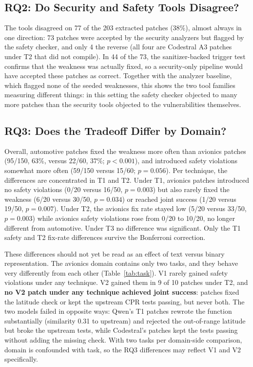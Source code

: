 \documentclass[12pt]{IEEEtran}
\begin{document}
\subsection{RQ2: Do Security and Safety Tools Disagree?}
The tools disagreed on 77 of the 203 extracted patches (38\%), almost always in one direction: 73 patches were accepted by the security analyzers but flagged by the safety checker, and only 4 the reverse (all four are Codestral A3 patches under T2 that did not compile). In 44 of the 73, the sanitizer-backed trigger test confirms that the weakness was actually fixed, so a security-only pipeline would have accepted these patches as correct. Together with the analyzer baseline, which flagged none of the seeded weaknesses, this shows the two tool families measuring different things: in this setting the safety checker objected to many more patches than the security tools objected to the vulnerabilities themselves.

\subsection{RQ3: Does the Tradeoff Differ by Domain?}
Overall, automotive patches fixed the weakness more often than avionics patches (95/150, 63\%, versus 22/60, 37\%; $p < 0.001$), and introduced safety violations somewhat more often (59/150 versus 15/60; $p = 0.056$). Per technique, the differences are concentrated in T1 and T2. Under T1, avionics patches introduced no safety violations (0/20 versus 16/50, $p = 0.003$) but also rarely fixed the weakness (6/20 versus 30/50, $p = 0.034$) or reached joint success (1/20 versus 19/50, $p = 0.007$). Under T2, the avionics fix rate stayed low (5/20 versus 33/50, $p = 0.003$) while avionics safety violations rose from 0/20 to 10/20, no longer different from automotive. Under T3 no difference was significant. Only the T1 safety and T2 fix-rate differences survive the Bonferroni correction.

These differences should not yet be read as an effect of text versus binary representation. The avionics domain contains only two tasks, and they behave very differently from each other (Table~\ref{tab:task}). V1 rarely gained safety violations under any technique. V2 gained them in 9 of 10 patches under T2, and \textbf{no V2 patch under any technique achieved joint success}: patches fixed the latitude check or kept the upstream CPR tests passing, but never both. The two models failed in opposite ways: Qwen's T1 patches rewrote the function substantially (similarity 0.31 to upstream) and rejected the out-of-range latitude but broke the upstream tests, while Codestral's patches kept the tests passing without adding the missing check. With two tasks per domain-side comparison, domain is confounded with task, so the RQ3 differences may reflect V1 and V2 specifically.
\end{document}
